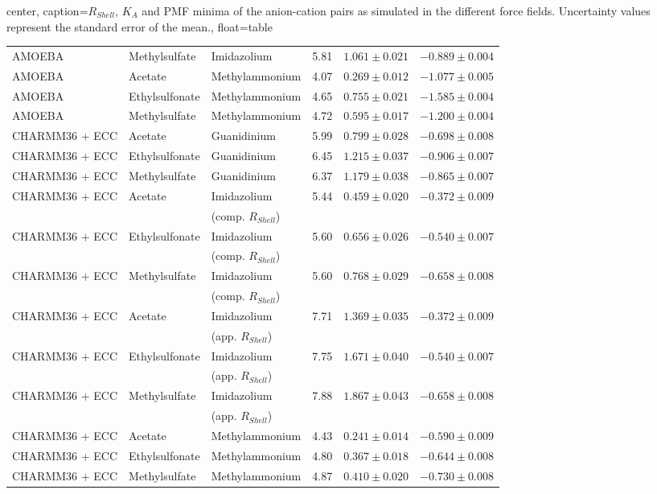 \documentclass[journal=jacsat,articletitle=true,manuscript=suppinfo,layout=onecolumn]{achemso}
\begin{document}
\begin{adjustbox}{center, caption={$R_{Shell}$, $K_{A}$ and PMF minima of the anion-cation pairs as simulated in the different force fields. Uncertainty values represent the standard error of the mean.}, float=table}
\begin{tabular}{l | l | l | c | c | c }
    AMOEBA         & Methylsulfate  & Imidazolium     & 5.81  & $1.061 \pm 0.021$ & $-0.889 \pm 0.004$ \\
    AMOEBA         & Acetate        & Methylammonium  & 4.07  & $0.269 \pm 0.012$ & $-1.077 \pm 0.005$ \\
    AMOEBA         & Ethylsulfonate & Methylammonium  & 4.65  & $0.755 \pm 0.021$ & $-1.585 \pm 0.004$ \\
    AMOEBA         & Methylsulfate  & Methylammonium  & 4.72  & $0.595 \pm 0.017$ & $-1.200 \pm 0.004$ \\ \hline
    CHARMM36 + ECC & Acetate        & Guanidinium     & 5.99  & $0.799 \pm 0.028$ & $-0.698 \pm 0.008$ \\
    CHARMM36 + ECC & Ethylsulfonate & Guanidinium     & 6.45  & $1.215 \pm 0.037$ & $-0.906 \pm 0.007$ \\
    CHARMM36 + ECC & Methylsulfate  & Guanidinium     & 6.37  & $1.179 \pm 0.038$ & $-0.865 \pm 0.007$ \\
    CHARMM36 + ECC & Acetate        & Imidazolium     & 5.44  & $0.459 \pm 0.020$ & $-0.372 \pm 0.009$ \\
    & & (comp. $R_{Shell}$) & & & \\
    CHARMM36 + ECC & Ethylsulfonate & Imidazolium     & 5.60 & $0.656 \pm 0.026$ & $-0.540 \pm 0.007$ \\
    & & (comp. $R_{Shell}$) & & & \\
    CHARMM36 + ECC & Methylsulfate  & Imidazolium     & 5.60 & $0.768 \pm 0.029$ & $-0.658 \pm 0.008$ \\
    & & (comp. $R_{Shell}$) & & & \\
    CHARMM36 + ECC & Acetate        & Imidazolium     & 7.71 & $1.369 \pm 0.035$ & $-0.372 \pm 0.009$ \\
    & & (app. $R_{Shell}$) & & & \\
    CHARMM36 + ECC & Ethylsulfonate & Imidazolium     & 7.75 & $1.671 \pm 0.040$ & $-0.540 \pm 0.007$ \\
    & & (app. $R_{Shell}$) & & & \\
    CHARMM36 + ECC & Methylsulfate  & Imidazolium     & 7.88 & $1.867 \pm 0.043$ & $-0.658 \pm 0.008$ \\
    & & (app. $R_{Shell}$) & & & \\
    CHARMM36 + ECC & Acetate        & Methylammonium  & 4.43  & $0.241 \pm 0.014$ & $-0.590 \pm 0.009$ \\
    CHARMM36 + ECC & Ethylsulfonate & Methylammonium  & 4.80  & $0.367 \pm 0.018$ & $-0.644 \pm 0.008$ \\
    CHARMM36 + ECC & Methylsulfate  & Methylammonium  & 4.87  & $0.410 \pm 0.020$ & $-0.730 \pm 0.008$
    \end{tabular}
    \end{adjustbox}
    \clearpage
    
\end{document}
